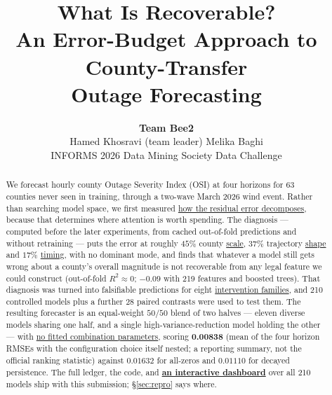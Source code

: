 \documentclass[10pt,letterpaper,twocolumn]{article}
\title{\vspace{-2.2em}\textbf{What Is Recoverable?}\\[2pt]
\large An Error-Budget Approach to County-Transfer\\Outage Forecasting}
\author{\normalsize\textbf{Team Bee2}\\[3pt]
\normalsize Hamed Khosravi (team leader) \qquad Melika Baghi\\[2pt]
\footnotesize INFORMS 2026 Data Mining Society Data Challenge}
\date{\vspace{-1em}}
\newcommand{\meth}[1]{\uline{#1}}   %
\begin{document}
\maketitle
\vspace{-1.5em}

\begin{abstract}\small
\noindent We forecast hourly county Outage Severity Index (OSI) at four horizons
for 63 counties never seen in training, through a two-wave March 2026 wind event.
Rather than searching model space, we first measured \meth{how the residual error
decomposes}, because that determines where attention is worth spending. The
diagnosis --- computed before the later experiments, from cached out-of-fold
predictions and without retraining --- puts the error at roughly $45\%$ county
\meth{scale}, $37\%$ trajectory \meth{shape} and $17\%$ \meth{timing}, with no
dominant mode, and finds that whatever a model still gets wrong about a county's
overall magnitude is not recoverable from any legal feature we could construct
(out-of-fold $R^2\!\approx\!0$; $-0.09$ with 219 features and boosted trees).
That diagnosis was turned into falsifiable predictions for eight
\meth{intervention families}, and 210 controlled models plus a further 28 paired
contrasts were used to test them. The resulting forecaster is an equal-weight
$50/50$ blend of two halves --- eleven diverse models sharing one half, and a
single high-variance-reduction model holding the other --- with \meth{no
fitted combination parameters}, scoring \textbf{0.00838} (mean of the
four horizon RMSEs with the configuration choice itself nested; a reporting
summary, not the official ranking statistic) against $0.01632$ for
all-zeros and $0.01110$ for decayed persistence. The full ledger, the
code, and \meth{\textbf{an interactive dashboard}} over all 210 models ship with this
submission; §\ref{sec:repro} says where.

\smallskip
\noindent{}
\end{abstract}
\end{document}
